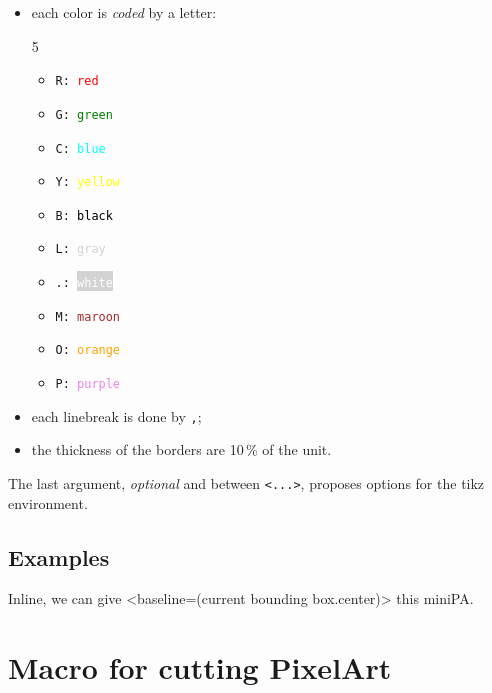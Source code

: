 \documentclass{article}
\begin{document}
\begin{itemize}
	\item each color is \textit{coded} by a letter:
	\begin{multicols}{5}
		\begin{itemize}
			\item \texttt{R: \textcolor{red}{red}}
			\item \texttt{G: \textcolor{green}{green}}
			\item \texttt{C: \textcolor{cyan}{blue}}
			\item \texttt{Y: \textcolor{yellow}{yellow}}
			\item \texttt{B: \textcolor{black}{black}}
			\item \texttt{L: \textcolor{lightgray}{gray}}
			\item \texttt{.: \colorbox{lightgray}{\textcolor{white}{white}}}
			\item \texttt{M: \textcolor{brown}{maroon}}
			\item \texttt{O: \textcolor{orange}{orange}}
			\item \texttt{P: \textcolor{violet}{purple}}
		\end{itemize}
	\end{multicols}
	\item each linebreak is done by \texttt{,};
	\item the thickness of the borders are 10\,\% of the unit.
\end{itemize}

The last argument, \textit{optional} and between \texttt{<...>}, proposes options for the \textsf{tikz} environment.

\subsection{Examples}

\begin{PresentationCode}{}
\end{PresentationCode}

\begin{PresentationCode}{}
Inline, we can give <baseline=(current bounding box.center)>
this miniPA.
\end{PresentationCode}

\newpage

\section{Macro for cutting PixelArt}
\end{document}
